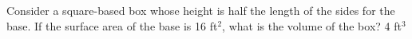 {Consider a square-based box whose height is half the length of the sides for the base. If the surface area of the base is 16 ft$^2$, what is the volume of the box? }
{4 ft$^3$}
